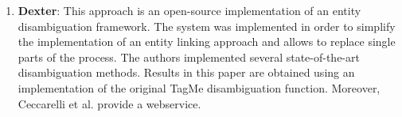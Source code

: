 \begin{enumerate}

\item \textbf{Dexter}: This approach \cite{ceccarelli2013dexter} is an open-source implementation of an entity disambiguation framework.
The system was implemented in order to simplify the implementation of an entity linking approach and allows to replace single parts of the process.
The authors implemented several state-of-the-art disambiguation methods.
Results in this paper are obtained using an implementation of the original TagMe disambiguation function.
Moreover, Ceccarelli et al. provide %
a webservice.
\end{enumerate}



